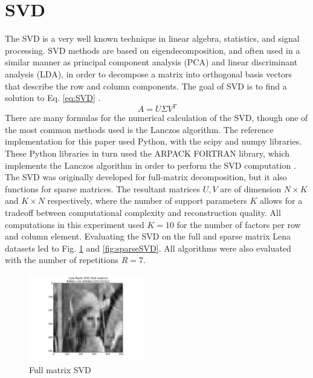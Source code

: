 \documentclass[journal]{IEEEtran}
\begin{document}
\section{SVD}
The SVD is a very well known technique in linear algebra, statistics, and signal processing. SVD methods are 
based on eigendecomposition, and often used 
in a similar manner as principal component analysis (PCA) and linear discriminant analysis (LDA), in order to decompose a matrix into 
orthogonal basis vectors that describe the row and column components. The goal of SVD is to find a solution to Eq. \ref{eq:SVD} \cite{SVDIntuition}.
\begin{equation}
    A=U \Sigma V^T
\label{eq:SVD}
\end{equation}
There are many formulas for the numerical calculation of the SVD, though one of the most common methods used is the Lanczos
algorithm. The reference implementation for this paper used Python, with the scipy and numpy libraries. These Python libraries in turn used 
the ARPACK FORTRAN library, which implements the Lanczos algorithm in order to perform the SVD computation \cite{SCIPYsource} \cite{ARPACKsource}. 
The SVD was originally developed for full-matrix decomposition, but it also functions for sparse matrices. 
The resultant matrices \begin{math}U,V\end{math} are of dimension \begin{math}N \times K\end{math} and \begin{math}K \times N\end{math} respectively, where the number of support parameters
\begin{math}K\end{math} allows for a tradeoff between computational complexity and reconstruction quality. All computations in this experiment used
\begin{math}K=10\end{math} for the number of factors per row and column element. Evaluating the SVD on the full and sparse matrix Lena datasets led to 
Fig. \ref{fig:fullSVD} and \ref{fig:sparseSVD}. All algorithms were also evaluated with the number of repetitions \begin{math}R = 7\end{math}.
\begin{figure}[h!]
\centering
    \includegraphics[width=0.45\textwidth]{fullsvd.png}
    \caption{Full matrix SVD}
    \label{fig:fullSVD}
\end{figure}
\end{document}
